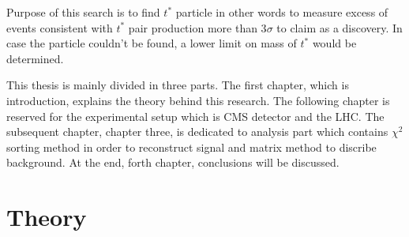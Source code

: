 \documentclass[12pt,oneandhalf,chaparabic,phys,ms,eng]{metu}
\begin{document}
Purpose of this search is to find $t^*$ particle in other words to measure excess of events consistent with $t^*$ pair production more than 3$\sigma$ to claim as a discovery. In case the particle couldn't be found, a lower limit on mass of $t^*$ would be determined.

This thesis is mainly divided in three parts. The first chapter, which is introduction, explains the theory behind this research. The following chapter is reserved for the experimental setup which is CMS detector and the LHC. The subsequent chapter, chapter three, is dedicated to analysis part which contains $\chi^{2}$ sorting method in order to reconstruct signal and matrix method to discribe background. At the end, forth chapter, conclusions will be discussed. 
 
\section{Theory}
\end{document}
